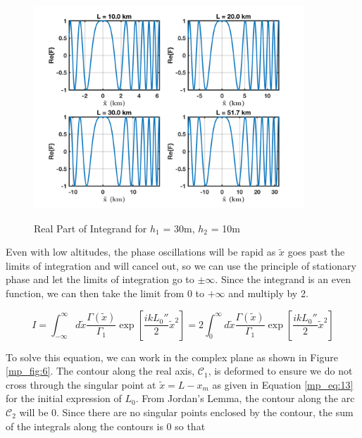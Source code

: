 \begin{figure}[H]
  \begin{center}
\includegraphics[width=4in]{../media/analysis/phaseVariation_30_50}
  \end{center}
  \renewcommand{\baselinestretch}{1} \small\normalsize
  \begin{quote}
  \caption[Real Part of Integrand for $h_1$ = 30m, $h_2$ = 50m]{ Real Part of Integrand for $h_1$ = 30m, $h_2$ = 10m\label{mp_fig:5}}
  \end{quote}
\end{figure}
\renewcommand{\baselinestretch}{2} \small\normalsize

Even with low altitudes, the phase oscillations will be rapid as $\tilde{x}$ goes past the limits of integration and will cancel out, so we can use the principle of stationary phase and let the limits of integration go to $\pm\infty$. Since the integrand is an even function, we can then take the limit from $0$ to $+\infty$ and multiply by 2.

\begin{equation}
I = \int_{-\infty}^{\infty}d\tilde{x} \frac{\Gamma(\tilde{x})}{\Gamma_1}\exp\left[\frac{ikL_0''}{2}\tilde{x}^2\right] = 2\int_{0}^{\infty}d\tilde{x} \frac{\Gamma(\tilde{x})}{\Gamma_1}\exp\left[\frac{ikL_0''}{2}\tilde{x}^2\right] 
\label{mp_eq:23}
\end{equation}

To solve this equation, we can work in the complex plane as shown in Figure \ref{mp_fig:6}. The contour along the real axis, $\mathcal{C}_1$, is deformed to ensure we do not cross through the singular point at $\tilde{x} = L-x_m$ as given in Equation \ref{mp_eq:13} for the initial expression of $L_0$. From Jordan's Lemma, the contour along the arc $\mathcal{C}_2$ will be $0$. Since there are no singular points enclosed by the contour, the sum of the integrals along the contours is $0$ so that

